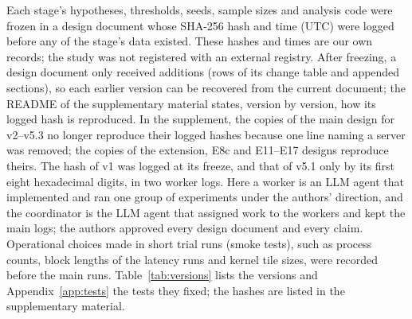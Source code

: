Each stage's hypotheses, thresholds, seeds, sample sizes and analysis code were frozen in a design document whose SHA-256 hash and time (UTC) were logged before any of the stage's data existed. These hashes and times are our own records; the study was not registered with an external registry. After freezing, a design document only received additions (rows of its change table and appended sections), so each earlier version can be recovered from the current document; the README of the supplementary material states, version by version, how its logged hash is reproduced. In the supplement, the copies of the main design for v2--v5.3 no longer reproduce their logged hashes because one line naming a server was removed; the copies of the extension, E8c and E11--E17 designs reproduce theirs. The hash of v1 was logged at its freeze, and that of v5.1 only by its first eight hexadecimal digits, in two worker logs. Here a worker is an LLM agent that implemented and ran one group of experiments under the authors' direction, and the coordinator is the LLM agent that assigned work to the workers and kept the main logs; the authors approved every design document and every claim. Operational choices made in short trial runs (smoke tests), such as process counts, block lengths of the latency runs and kernel tile sizes, were recorded before the main runs. Table~\ref{tab:versions} lists the versions and Appendix~\ref{app:tests} the tests they fixed\ifarxiv\else; the hashes are listed in the supplementary material\fi.

